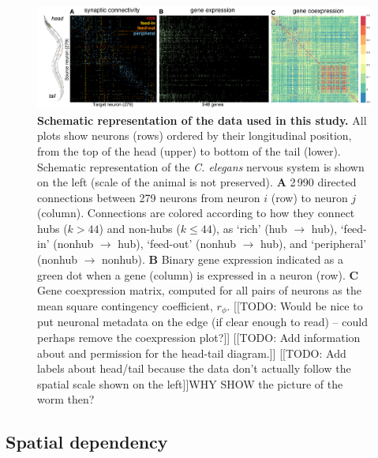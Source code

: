 \documentclass[10pt,letterpaper]{article}
\begin{document}
\begin{figure}[h]
  \centering
    \includegraphics[width=1\textwidth]{schematic.pdf}
 \caption{\textbf{Schematic representation of the data used in this study.}
All plots show neurons (rows) ordered by their longitudinal position, from the top of the head (upper) to bottom of the tail (lower).
Schematic representation of the \textit{C. elegans} nervous system is shown on the left (scale of the animal is not preserved).
 \textbf{A} 2\,990 directed connections between 279 neurons from neuron $i$ (row) to neuron $j$ (column).
Connections are colored according to how they connect hubs ($k > 44$) and non-hubs ($k \leq 44$), as `rich' (hub $\rightarrow$ hub), `feed-in' (nonhub $\rightarrow$ hub), `feed-out' (nonhub $\rightarrow$ hub), and `peripheral' (nonhub $\rightarrow$ nonhub).
  \textbf{B} Binary gene expression indicated as a green dot when a gene (column) is expressed in a neuron (row).
 \textbf{C} Gene coexpression matrix, computed for all pairs of neurons as the mean square contingency coefficient, $r_\phi$.
[[TODO: Would be nice to put neuronal metadata on the edge (if clear enough to read) -- could perhaps remove the coexpression plot?]]
[[TODO: Add information about and permission for the head-tail diagram.]]
[[TODO: Add labels about head/tail because the data don't actually follow the spatial scale shown on the left]]WHY SHOW the picture of the worm then?
}
\label{fig:SchematicRepresentation}
\end{figure}


\subsection*{Spatial dependency}
\end{document}
